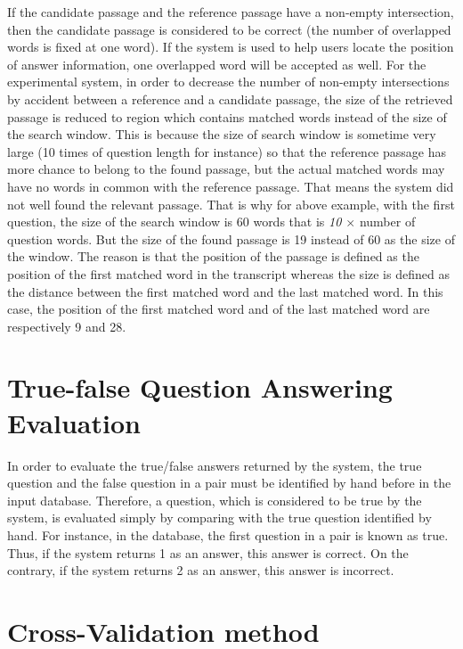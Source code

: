 If the candidate passage and the reference passage have a non-empty intersection, then the candidate passage is considered to be correct (the number of overlapped words is fixed at one word). If the system is used to help users locate the position of answer information, one overlapped word will be accepted as well. For the experimental system, in order to decrease the number of non-empty intersections by accident between a reference and a candidate passage, the size of the retrieved passage is reduced to region which contains matched words instead of the size of the search window. This is because the size of search window is sometime very large (10 times of question length for instance) so that the reference passage has more chance to belong to the found passage, but the actual matched words may have no words in common with the reference passage. That means the system did not well found the relevant passage. That is why for above example, with the first question, the size of the search window is 60 words that is \textit{10 \ensuremath{\times}} number of question words. But the size of the found passage is 19 instead of 60 as the size of the window. The reason is that the position of the passage is defined as the position of the first matched word in the transcript whereas the size is defined as the distance between the first matched word and the last matched word. In this case, the position of the first matched word and of the last matched word are respectively 9 and 28.


\section{True-false Question Answering Evaluation}

In order to evaluate the true/false answers returned by the system, the true question and the false question in a pair must be identified by hand before in the input database. Therefore, a question, which is considered to be true by the system, is evaluated simply by comparing with the true question identified by hand. For instance, in the database, the first question in a pair is known as true.  Thus, if the system returns 1 as an answer, this answer is correct. On the contrary, if the system returns 2 as an answer, this answer is incorrect.




\section{Cross-Validation method}
 
